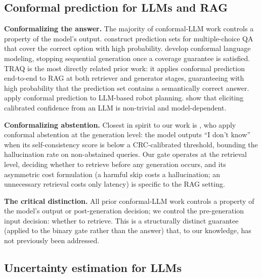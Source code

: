 \documentclass[a4paper,fleqn]{cas-dc}
\begin{document}
\subsection{Conformal prediction for LLMs and RAG}

\textbf{Conformalizing the answer.} The majority of conformal-LLM work controls a
property of the model's output. \citet{kumar2023conformalqa} construct
prediction sets for multiple-choice QA that cover the correct option with high
probability. \citet{quach2024conformallm} develop conformal language modeling,
stopping sequential generation once a coverage guarantee is satisfied. TRAQ
\citep{li2024traq} is the most directly related prior work: it applies conformal
prediction end-to-end to RAG at both retriever and generator stages, guaranteeing
with high probability that the prediction set contains a semantically correct
answer. \citet{ren2023knowno} apply conformal prediction to LLM-based robot
planning. \citet{xiong2024llmuncertainty} show that eliciting calibrated
confidence from an LLM is non-trivial and model-dependent.

\textbf{Conformalizing abstention.} Closest in spirit to our work is
\citet{abbasiyadkori2024conformalabstention}, who apply conformal abstention at
the generation level: the model outputs ``I don't know'' when its
self-consistency score is below a CRC-calibrated threshold, bounding the
hallucination rate on non-abstained queries. Our gate operates at the
retrieval level, deciding whether to retrieve before any generation
occurs, and its asymmetric cost formulation (a harmful skip costs a
hallucination; an unnecessary retrieval costs only latency) is specific to the
RAG setting.

\textbf{The critical distinction.} All prior conformal-LLM work controls a
property of the model's output or post-generation decision; we control the
pre-generation input decision: whether to retrieve. This is a structurally
distinct guarantee (applied to the binary gate rather than the answer) that,
to our knowledge, has not previously been addressed.

\subsection{Uncertainty estimation for LLMs}
\end{document}
